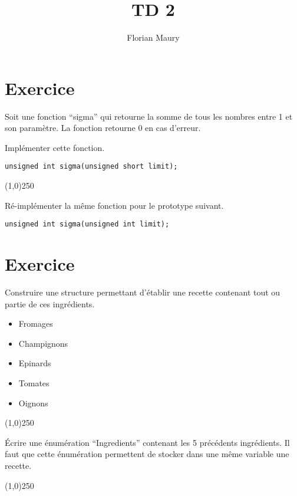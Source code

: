 \documentclass[10pt]{article}
\title{TD 2}
\author{Florian Maury}
\begin{document}
\section{Exercice}

{\small
Soit une fonction ``sigma'' qui retourne la somme de tous les nombres entre 1 et son paramètre.
La fonction retourne 0 en cas d'erreur.

Implémenter cette fonction.
\begin{verbatim}
unsigned int sigma(unsigned short limit);
\end{verbatim}
}

\begin{center}
\line(1,0){250}
\end{center}

{\small
Ré-implémenter la même fonction pour le prototype suivant.
\begin{verbatim}
unsigned int sigma(unsigned int limit);
\end{verbatim}
}

\section{Exercice}

{\small
Construire une structure permettant d'établir une recette contenant tout ou partie de ces ingrédients.
\begin{itemize}
  \item Fromages
  \item Champignons
  \item Epinards
  \item Tomates
  \item Oignons
\end{itemize}
}

\begin{center}
\line(1,0){250}
\end{center}

{\small
\'Ecrire une énumération ``Ingredients'' contenant les 5 précédents ingrédients. Il faut que cette énumération permettent de stocker dans une même variable une recette.
}

\begin{center}
\line(1,0){250}
\end{center}
\end{document}
